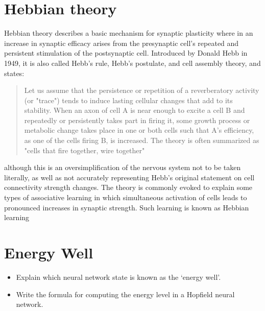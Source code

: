 \documentclass[a4paper,11pt]{report}
\begin{document}
\newpage
\section{Hebbian theory}
Hebbian theory describes a basic mechanism for synaptic plasticity
where in an increase in synaptic efficacy arises from the
presynaptic cell's repeated and persistent stimulation of the
postsynaptic cell. Introduced by Donald Hebb in 1949, it is also
called Hebb's rule, Hebb's postulate, and cell assembly theory,
and states: \begin{quote}Let us assume that the persistence or
repetition of a reverberatory activity (or "trace") tends to
induce lasting cellular changes that add to its stability. When
an axon of cell A is near enough to excite a cell B and repeatedly
or persistently takes part in firing it, some growth process or
metabolic change takes place in one or both cells such that A's
efficiency, as one of the cells firing B, is increased. The theory
is often summarized as "cells that fire together, wire together"
\end{quote} although this is an oversimplification of the nervous system
not to be taken literally, as well as not accurately representing
Hebb's original statement on cell connectivity strength changes.
The theory is commonly evoked to explain some types of associative
learning in which simultaneous activation of cells leads to
pronounced increases in synaptic strength. Such learning is known
as Hebbian learning

\newpage
\section{Energy Well}
\begin{itemize}
\item Explain which neural network state is known as the `energy
well'. \item Write the formula for computing the energy level in a
Hopfield neural network.
\end{itemize}
\end{document}
